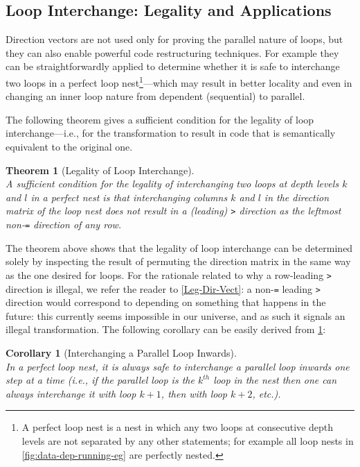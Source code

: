 \documentclass[acmsmall,review]{acmart}\settopmatter{printfolios=true,printccs=false,printacmref=false}
\newtheorem{mytheo}{Theorem}
\newtheorem{mycorol}{Corollary}
\begin{document}
\subsection{Loop Interchange: Legality and Applications}
\label{subsec:loop-interch}

Direction vectors are not used only for proving the parallel
nature of loops, but they can also enable powerful code
restructuring techniques. For example they can be 
straightforwardly applied to determine whether it is safe
to interchange two loops in a perfect loop nest\footnote{
A perfect loop nest is a nest in which any two loops at
consecutive depth levels are not separated by any other 
statements; for example all loop nests in 
\cref{fig:data-dep-running-eg} are perfectly nested.
}---which may result in better locality and even in changing
an inner loop nature from dependent (sequential) to parallel.

The following theorem gives a sufficient condition for the
legality of loop interchange---i.e., for the transformation 
to result in code that is semantically equivalent to the original one.


\begin{mytheo}[Legality of Loop Interchange]\label{Loop-Interch}
$\mbox{ }$\\
A sufficient condition for the legality of interchanging 
two loops at depth levels $k$ and $l$ in a perfect nest 
is that interchanging columns $k$ and $l$ in the direction 
matrix of the loop nest {\em does not result} in a (leading)
{\tt>} direction as the leftmost non-{\tt=} direction 
of any row.
\end{mytheo}

The theorem above shows that the legality of loop interchange
can be determined solely by inspecting the result of permuting
the direction matrix in the same way as the one desired for loops.
For the rationale related to why a row-leading {\tt>} direction
is illegal, we refer the reader to \cref{Leg-Dir-Vect}: a non-{\tt=}
leading {\tt>} direction would correspond to depending on something
that happens in the future: this currently seems impossible in our
universe, and as such it signals an illegal transformation.
%
The following corollary can be easily derived from \cref{Loop-Interch}:

\begin{mycorol}[Interchanging a Parallel Loop Inwards]\label{Par-Loop-Interch}
$\mbox{ }$\\
In a perfect loop nest, it is always safe to interchange a 
{\em parallel loop} inwards one step at a time (i.e., if the
parallel loop is the $k^{th}$ loop in the nest then one can
always interchange it with loop $k+1$, then with loop $k+2$, etc.).
\end{mycorol}
\end{document}
